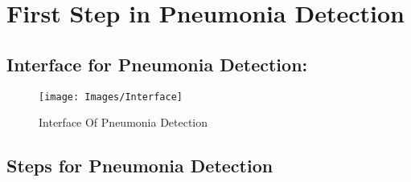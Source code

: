 %

\chapter{First Step in Pneumonia Detection}

\section{Interface for Pneumonia Detection:}

\begin{figure}[h!]
	\centering
	\texttt{[image: Images/Interface]}
	\caption{Interface Of Pneumonia Detection}
\end{figure}

\section{Steps for Pneumonia Detection}


